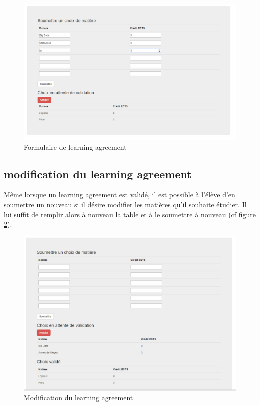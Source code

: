 \begin{figure}[H]
	\centering
	\includegraphics[scale=0.35]{images/voeux1.png}
	\caption{Formulaire de learning agreement}
	\label{voeux1}
\end{figure}

\subsection{modification du learning agreement}

Même lorsque un learning agreement est validé, il est possible à l'élève d'en soumettre un nouveau si il désire modifier les matières qu'il souhaite étudier. Il lui suffit de remplir alors à nouveau la table et à le soumettre à nouveau (cf figure \ref{voeux2}).

\begin{figure}[H]
	\centering
	\includegraphics[scale=0.35]{images/voeux2.png}
	\caption{Modification du learning agreement}
	\label{voeux2}
\end{figure}

